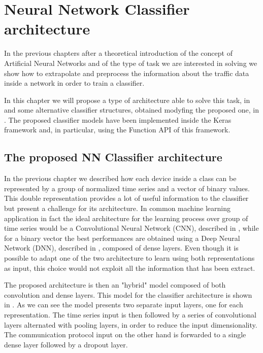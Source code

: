 \chapter{Neural Network Classifier architecture}

In the previous chapters after a theoretical introduction of the concept of Artificial Neural Networks and of the type of task we are interested in solving we show how to extrapolate and preprocess the information about the traffic data inside a network in order to train a classifier.

In this chapter we will propose a type of architecture able to solve this task, in  and some  alternative classifier structures, obtained modyfing the proposed one, in . The proposed classifier models have been implemented inside the Keras framework and, in particular, using the Function API of this framework. 




\section{The proposed NN Classifier architecture}\label{modelprop}

In the previous chapter we described how each device inside a class can be represented by a group of normalized time series and a vector of binary values. This double representation provides a lot of useful information to the classifier but present a challenge for its architecture. In common machine learning application in fact the ideal architecture for the learning process over group of time series would be a Convolutional Neural Network (CNN), described in , while for a binary vector the best performances are obtained using a Deep Neural Network (DNN), described in , composed of dense layers.
Even though it is possible to adapt one of the two architecture to learn using both representations as input, this choice would not exploit all the information that has been extract. 

The proposed architecture is then an "hybrid" model composed of both convolution and dense layers.
This model for the classifier architecture is shown in . As we can see the model presents two separate input layers, one for each representation. The time series input is then followed by a series of convolutional layers alternated with pooling layers, in order to reduce the input dimensionality. The communication protocol input on the other hand is forwarded to a single dense layer followed by a dropout layer.

